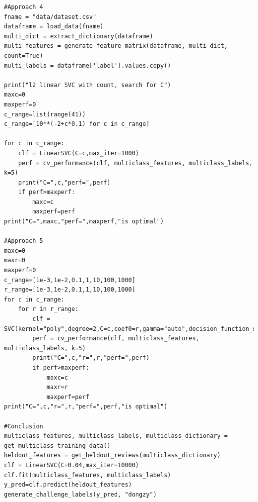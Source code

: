\documentclass{article}
\begin{document}
\begin{lstlisting}
#Approach 4
fname = "data/dataset.csv"
dataframe = load_data(fname)
multi_dict = extract_dictionary(dataframe)
multi_features = generate_feature_matrix(dataframe, multi_dict, count=True)
multi_labels = dataframe['label'].values.copy()

print("l2 linear SVC with count, search for C")
maxc=0
maxperf=0
c_range=list(range(41))
c_range=[10**(-2+c*0.1) for c in c_range]

for c in c_range:
    clf = LinearSVC(C=c,max_iter=1000)
    perf = cv_performance(clf, multiclass_features, multiclass_labels, k=5)
    print("C=",c,"perf=",perf)
    if perf>maxperf:
        maxc=c
        maxperf=perf
print("C=",maxc,"perf=",maxperf,"is optimal")

#Approach 5
maxc=0
maxr=0
maxperf=0
c_range=[1e-3,1e-2,0.1,1,10,100,1000]
r_range=[1e-3,1e-2,0.1,1,10,100,1000]
for c in c_range:
    for r in r_range:
        clf = SVC(kernel="poly",degree=2,C=c,coef0=r,gamma="auto",decision_function_shape="ovo")
        perf = cv_performance(clf, multiclass_features, multiclass_labels, k=5)
        print("C=",c,"r=",r,"perf=",perf)
        if perf>maxperf:
            maxc=c
            maxr=r
            maxperf=perf
print("C=",c,"r=",r,"perf=",perf,"is optimal")

#Conclusion
multiclass_features, multiclass_labels, multiclass_dictionary = get_multiclass_training_data()
heldout_features = get_heldout_reviews(multiclass_dictionary)
clf = LinearSVC(C=0.04,max_iter=10000)
clf.fit(multiclass_features, multiclass_labels)
y_pred=clf.predict(heldout_features)
generate_challenge_labels(y_pred, "dongzy")
\end{lstlisting}
\end{document}
